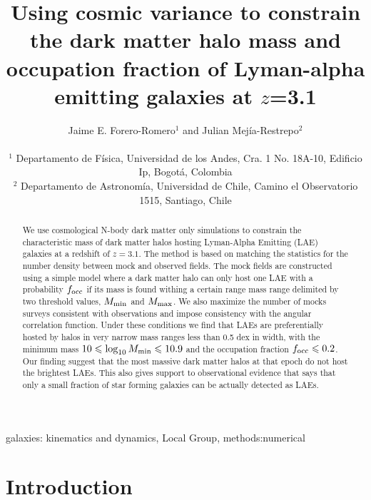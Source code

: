 \documentclass[usenatbib]{mn2e}
\begin{document}
\title[Halo mass and occupation fraction for LAEs at $z=3.1$]{Using cosmic
  variance to constrain the dark matter halo mass and occupation
  fraction of Lyman-alpha emitting galaxies at $z$=3.1} 
  
\author[~J.~E. Forero-Romero and J. Mejia]{
\parbox[t]{\textwidth}{\raggedright 
Jaime E. Forero-Romero$^{1}$ and
Julian Mej\'ia-Restrepo$^{2}$ 
}
\vspace*{6pt}\\
$^{1}$ Departamento de F\'{i}sica, Universidad de los Andes, Cra. 1
No. 18A-10, Edificio Ip, Bogot\'a, Colombia \\
$^{2}$ Departamento de Astronom\'{i}a, Universidad de Chile, Camino el
Observatorio 1515, Santiago, Chile} 

\maketitle

\begin{abstract}
We use cosmological N-body dark matter only simulations to constrain the
characteristic mass of dark matter halos hosting Lyman-Alpha Emitting
(LAE) galaxies at a redshift of $z=3.1$. The method is based on
matching the statistics for the number density between mock and
observed fields. The mock fields are constructed using a simple model
where a dark matter halo can only host one LAE with a probability
$f_{\rm occ}$ if its mass is found withing a certain range mass range
delimited by two threshold values, $M_{\rm min}$ and $M_{\rm max}$. 
We also maximize the number of mocks surveys consistent with
observations and impose consistency with the angular correlation
function. Under these conditions we find that LAEs are preferentially
hosted by halos in very narrow mass ranges less than 0.5 dex in width,
with the minimum mass $10\leq \log_{10}M_{\rm min}\leq 10.9$ and the
occupation fraction $f_{\rm   occ}\leq 0.2$.  Our finding suggest that
the most massive dark matter halos at that epoch do not host the
brightest LAEs. This also gives support to observational evidence that
says that only a small fraction of star forming galaxies can be
actually detected as LAEs.
\end{abstract}

\begin{keywords}
{galaxies: kinematics and dynamics, Local Group, methods:numerical}
\end{keywords}


\section{Introduction}
\end{document}
